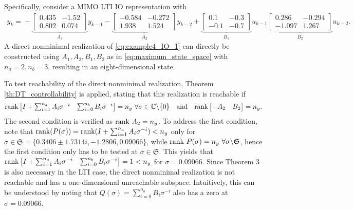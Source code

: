Specifically, consider a MIMO LTI IO representation with
\begin{align}\label{eq:example4_IO_1}
    y_k \!=\! -\underbrace{\left[\begin{array}{cc} 0.435 & -1.52\\ 0.802 & 0.074 \end{array}\right]}_{A_1} y_{k-1} - \underbrace{\left[\begin{array}{cc} -0.584 & -0.272\\ 1.938 & 1.524 \end{array}\right]}_{A_2} y_{k-2} + \underbrace{\left[\begin{array}{cc} 0.1 & -0.3\\ -0.1 & -0.7 \end{array}\right]}_{B_1}u_{k-1} \underbrace{\left[\begin{array}{cc} 0.286 & -0.294\\ -1.097 & 1.267 \end{array}\right]}_{B_2} u_{k-2}.
\end{align}
A direct nonminimal realization of \eqref{eq:example4_IO_1} can directly be constructed using $A_1,A_2,B_1,B_2$ as in \eqref{eq:maximum_state_space} with $n_a=2,n_b=3$, resulting in an eight-dimensional state.

To test reachability of the direct nonminimal realization, Theorem \ref{th:DT_controllability} is applied, stating that this realization is reachable if
\begin{align}\label{eq:example4_reachability}
    \textrm{rank} \begin{bmatrix} I + \sum_{i=1}^{n_a} A_i \sigma^{-i} & \sum_{i=0}^{n_b} B_i \sigma^{-i} \end{bmatrix} = n_y \ \forall \sigma \in \mathbb{C} \backslash \{ 0 \} & & \textrm{and} & &
    \textrm{rank} \begin{bmatrix}
        -A_2 & B_2
    \end{bmatrix} = n_y.
\end{align}
The second condition is verified as $\textrm{rank}\ A_2 = n_y$. To address the first condition, note that $\textrm{rank}( P(\sigma)) = \textrm{rank} (I + \sum_{i=1}^{n_a} A_i \sigma^{-i}) < n_y$ only for $\sigma \in \mathfrak{S} = \{ 0.3406 \pm 1.7314i, -1.2806, 0.09066\}$, while $\textrm{rank}\ P(\sigma) = n_y \ \forall \sigma \backslash \mathfrak{S} $, hence the first condition only has to be tested at $\sigma \in \mathfrak{S}$. This yields that $\textrm{rank} \begin{bmatrix} I + \sum_{i=1}^{n_a} A_i \sigma^{-i} & \sum_{i=0}^{n_b} B_i \sigma^{-i} \end{bmatrix} = 1 < n_y$ for $\sigma = 0.09066$. Since Theorem 3 is also necessary in the LTI case, the direct nonminimal realization is not reachable and has a one-dimensional unreachable subspace. Intuitively, this can be understood by noting that $Q(\sigma) = \sum_{i=0}^{n_b} B_i \sigma^{-i}$ also has a zero at $\sigma = 0.09066$.

